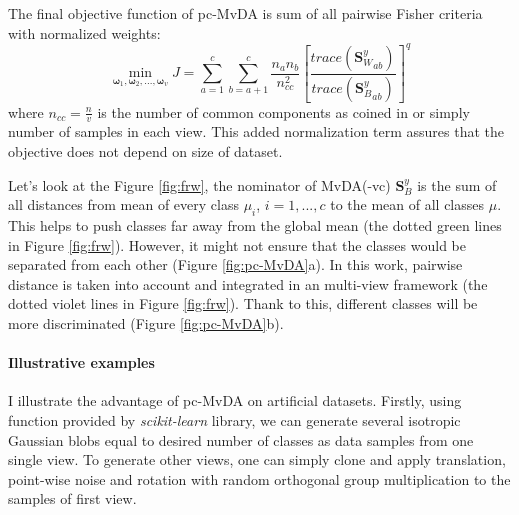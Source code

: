         The final objective function of pc-MvDA is sum of all pairwise Fisher criteria with normalized weights:
        \begin{equation}
            \operatorname*{min}_{\boldsymbol{\omega}_1, \boldsymbol{\omega}_2,..., \boldsymbol{\omega}_v}{J}=\sum_{a=1}^{c}\sum_{b=a+1}^{c}{\frac{n_an_b}{n_{cc}^2}{\left[{\frac{trace\left({\boldsymbol{S}_W^y}_{ab}\right)}{trace\left({\boldsymbol{S}_B^y}_{ab}\right)}}\right]}^{q}}
            \label{eq:pc-MvDA}
        \end{equation}
        where $n_{cc} = \frac{n}{v}$ is the number of common components as coined in \cite{you2019multi} or simply number of samples in each view. This added normalization term assures that the objective does not depend on size of dataset.

        Let's look at the Figure \ref{fig:frw}, the nominator of MvDA(-vc) $\boldsymbol{S}_B^y$ is the sum of all distances from mean of every class $\mu_i$, $i = {1,...,c}$ to the mean of all classes $\mu$.
        This helps to push classes far away from the global mean (the dotted green lines in Figure \ref{fig:frw}).
        However, it might not ensure that the classes would be separated from each other (Figure \ref{fig:pc-MvDA}a).
        In this work, pairwise distance is taken into account and integrated in an multi-view framework (the dotted violet lines in Figure \ref{fig:frw}).
        Thank to this, different classes will be more discriminated (Figure \ref{fig:pc-MvDA}b).

    \paragraph{Illustrative examples}
        I illustrate the advantage of pc-MvDA on artificial datasets.
        Firstly, using function provided by \textit{scikit-learn} library, we can generate several isotropic Gaussian blobs equal to desired number of classes as data samples from one single view.  %
        To generate other views, one can simply clone and apply translation, point-wise noise and rotation with random orthogonal group multiplication to the samples of first view.

